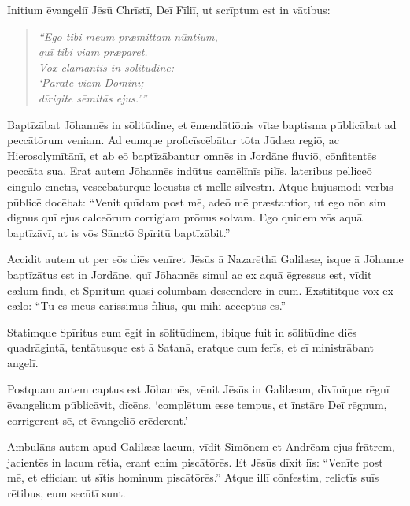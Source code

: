 
\Caput
\Versus Initium ēvangeliī Jēsū Chrīstī, Deī Fīliī,
\Versus ut scrīptum est in vātibus:

\begin{verse}
\begin{patverse*}
\emph{``Ego tibi meum præmittam nūntium,\\
quī tibi viam præparet.\\
\Versus Vōx clāmantis in sōlitūdine:\\
`Parāte viam Dominī;\\
dīrigite sēmitās ejus.'{}''}
\end{patverse*}
\end{verse}

\Versus Baptīzābat Jōhannēs in sōlitūdine, et ēmendātiōnis vītæ baptisma pūblicābat ad peccātōrum veniam.
\Versus Ad eumque proficīscēbātur tōta Jūdæa regiō, ac Hierosolymītānī, et ab eō baptīzābantur omnēs in Jordāne fluviō, cōnfitentēs peccāta sua.
\Versus Erat autem Jōhannēs indūtus camēlīnīs pilīs, lateribus pelliceō cingulō cīnctīs, vescēbāturque locustīs et melle silvestrī.
\Versus Atque hujusmodī verbīs pūblicē docēbat: ``Venit quīdam post mē, adeō mē præstantior, ut ego nōn sim dignus quī ejus calceōrum corrigiam prōnus solvam.
\Versus Ego quidem vōs aquā baptīzāvī, at is vōs Sānctō Spīritū baptīzābit.''

\Versus Accidit autem ut per eōs diēs venīret Jēsūs ā Nazarēthā Galilææ, isque ā Jōhanne baptīzātus est in Jordāne,
\Versus quī Jōhannēs simul ac ex aquā ēgressus est, vīdit cælum findī, et Spīritum quasi columbam dēscendere in eum.
\Versus Exstititque vōx ex cælō: ``Tū es meus cārissimus fīlius, quī mihi acceptus es.''

\Versus Statimque Spīritus eum ēgit in sōlitūdinem,
\Versus ibique fuit in sōlitūdine diēs quadrā\-gintā, tentātusque est ā Satanā, eratque cum ferīs, et eī ministrābant angelī.

\Versus Postquam autem captus est Jōhannēs, vēnit Jēsūs in Galilæam, dīvīnīque rēgnī ēvangelium pūblicāvit,
\Versus dīcēns, `complētum esse tempus, et īnstāre Deī rēgnum, corrigerent sē, et ēvangeliō crēderent.'

\Versus Ambulāns autem apud Galilææ lacum, vīdit Simōnem et Andrēam ejus frātrem, jacientēs in lacum rētia, erant enim piscātōrēs.
\Versus Et Jēsūs dīxit iīs: ``Venīte post mē, et efficiam ut sītis hominum piscātōrēs.''
\Versus Atque illī cōnfestim, relictīs suīs rētibus, eum secūtī sunt.

